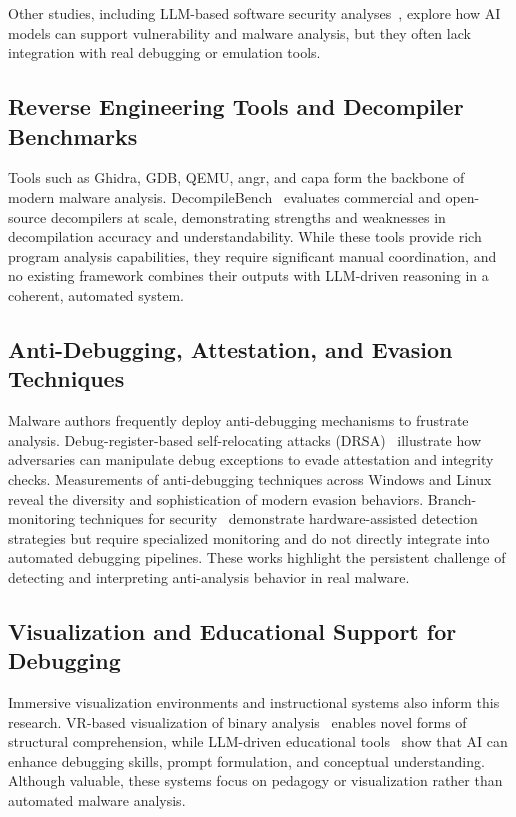 \documentclass[conference]{IEEEtran}
\begin{document}
Other studies, including LLM-based software security analyses~\cite{vaddiparthy2025llmsecurity}, explore how AI models can support vulnerability and malware analysis, but they often lack integration with real debugging or emulation tools.

\subsection{Reverse Engineering Tools and Decompiler Benchmarks}

Tools such as Ghidra, GDB, QEMU, angr, and capa form the backbone of modern malware analysis. DecompileBench~\cite{gao2025decompilebench} evaluates commercial and open-source decompilers at scale, demonstrating strengths and weaknesses in decompilation accuracy and understandability. While these tools provide rich program analysis capabilities, they require significant manual coordination, and no existing framework combines their outputs with LLM-driven reasoning in a coherent, automated system.

\subsection{Anti-Debugging, Attestation, and Evasion Techniques}

Malware authors frequently deploy anti-debugging mechanisms to frustrate analysis. Debug-register-based self-relocating attacks (DRSA)~\cite{bypassremoteattestation2025} illustrate how adversaries can manipulate debug exceptions to evade attestation and integrity checks. Measurements of anti-debugging techniques across Windows and Linux~\cite{antidebugmeasure2025} reveal the diversity and sophistication of modern evasion behaviors. Branch-monitoring techniques for security~\cite{botacin2018branchmonitoring} demonstrate hardware-assisted detection strategies but require specialized monitoring and do not directly integrate into automated debugging pipelines. These works highlight the persistent challenge of detecting and interpreting anti-analysis behavior in real malware.

\subsection{Visualization and Educational Support for Debugging}

Immersive visualization environments and instructional systems also inform this research. VR-based visualization of binary analysis~\cite{brown2025llmvisre} enables novel forms of structural comprehension, while LLM-driven educational tools~\cite{k12llmdebugging2025,usemewisely2025} show that AI can enhance debugging skills, prompt formulation, and conceptual understanding. Although valuable, these systems focus on pedagogy or visualization rather than automated malware analysis.
\end{document}
